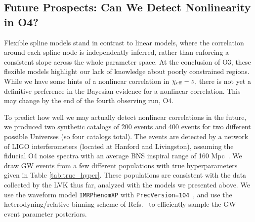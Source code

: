 \begin{refsection}




\section{Future Prospects: Can We Detect Nonlinearity in O4?}
\label{sec: spline o4_projections}
Flexible spline models stand in contrast to linear models, where the correlation around each spline node is independently inferred, rather than enforcing a consistent slope across the whole parameter space. 
At the conclusion of O3, these flexible models highlight our lack of knowledge about poorly constrained regions. While we have some hints of a nonlinear correlation in $\chi_{\rm eff}-z$, there is not yet a definitive preference in the Bayesian evidence for a nonlinear correlation. This may change by the end of the fourth observing run, O4. 

To predict how well we may actually detect nonlinear correlations in the future, we produced two synthetic catalogs of 200 events and 400 events for two different possible Universes (so four catalogs total). The events are detected by a network of LIGO interferometers (located at Hanford and Livingston), assuming the fiducial O4 noise spectra with an average BNS inspiral range of 160 Mpc~\cite{O3_psds}. We draw \ac{GW} events from a few different populations with true hyperparameters given in Table \ref{tab:true_hyper}. These populations are consistent with the data collected by the \ac{LVK} thus far, analyzed with the models we presented above. We use the waveform model \texttt{IMRPhenomXP} with \texttt{PrecVersion=104}~\cite{Pratten:2020ceb}, and use the heterodyning/relative binning scheme of Refs.~\cite{Cornish:2010kf, Cornish:2021lje, Zackay:2018qdy} to efficiently sample the \ac{GW} event parameter posteriors.


\end{refsection}
